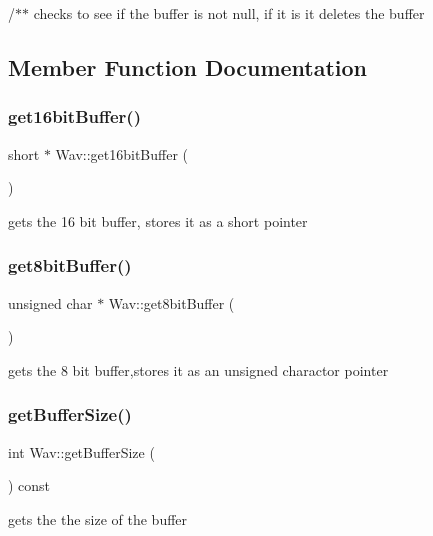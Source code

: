 /$\ast$$\ast$ checks to see if the buffer is not null, if it is it deletes the buffer 

\subsection{Member Function Documentation}
\mbox{\label{classWav_a1ec518bcccf38dbd25dd71b3a2b6dfd9}} 
\subsubsection{\texorpdfstring{get16bit\+Buffer()}{get16bitBuffer()}}
{\footnotesize\ttfamily short $\ast$ Wav\+::get16bit\+Buffer (\begin{DoxyParamCaption}{ }\end{DoxyParamCaption})}

gets the 16 bit buffer, stores it as a short pointer \mbox{\label{classWav_a998e6927c64d21c466c0ed552a889757}} 
\subsubsection{\texorpdfstring{get8bit\+Buffer()}{get8bitBuffer()}}
{\footnotesize\ttfamily unsigned char $\ast$ Wav\+::get8bit\+Buffer (\begin{DoxyParamCaption}{ }\end{DoxyParamCaption})}

gets the 8 bit buffer,stores it as an unsigned charactor pointer \mbox{\label{classWav_a71fdfa1d9f5e7c1b86f07bbff4249dca}} 
\subsubsection{\texorpdfstring{get\+Buffer\+Size()}{getBufferSize()}}
{\footnotesize\ttfamily int Wav\+::get\+Buffer\+Size (\begin{DoxyParamCaption}{ }\end{DoxyParamCaption}) const}

gets the the size of the buffer \mbox{\label{classWav_a1c4230cec49d30147a5b8a1950083f7c}} 
